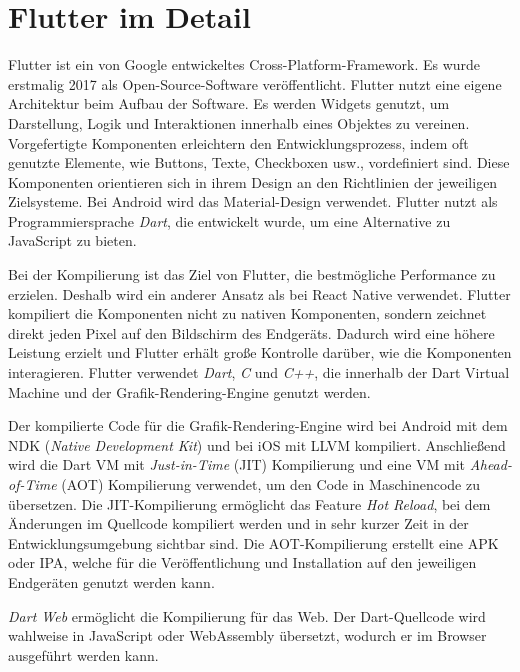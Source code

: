 \section{Flutter im Detail}
Flutter ist ein von Google entwickeltes Cross-Platform-Framework. Es wurde erstmalig 2017 als Open-Source-Software veröffentlicht. Flutter nutzt eine eigene Architektur beim Aufbau der Software. Es werden Widgets genutzt, um Darstellung, Logik und Interaktionen innerhalb eines Objektes zu vereinen. Vorgefertigte Komponenten erleichtern den Entwicklungsprozess, indem oft genutzte Elemente, wie Buttons, Texte, Checkboxen usw., vordefiniert sind. Diese Komponenten orientieren sich in ihrem Design an den Richtlinien der jeweiligen Zielsysteme. Bei Android wird das Material-Design verwendet. Flutter nutzt als Programmiersprache \textit{Dart}, die entwickelt wurde, um eine Alternative zu JavaScript zu bieten.

\vspace{0.5cm}

Bei der Kompilierung ist das Ziel von Flutter, die bestmögliche Performance zu erzielen. Deshalb wird ein anderer Ansatz als bei React Native verwendet. Flutter kompiliert die Komponenten nicht zu nativen Komponenten, sondern zeichnet direkt jeden Pixel auf den Bildschirm des Endgeräts. Dadurch wird eine höhere Leistung erzielt und Flutter erhält große Kontrolle darüber, wie die Komponenten interagieren. Flutter verwendet \textit{Dart}, \textit{C} und \textit{C++}, die innerhalb der Dart Virtual Machine und der Grafik-Rendering-Engine genutzt werden.

\vspace{0.5cm}

Der kompilierte Code für die Grafik-Rendering-Engine wird bei Android mit dem NDK (\textit{Native Development Kit}) und bei iOS mit LLVM kompiliert. Anschließend wird die Dart VM mit \textit{Just-in-Time} (JIT) Kompilierung und eine VM mit \textit{Ahead-of-Time} (AOT) Kompilierung verwendet, um den Code in Maschinencode zu übersetzen. Die JIT-Kompilierung ermöglicht das Feature \textit{Hot Reload}, bei dem Änderungen im Quellcode kompiliert werden und in sehr kurzer Zeit in der Entwicklungsumgebung sichtbar sind. Die AOT-Kompilierung erstellt eine APK oder IPA, welche für die Veröffentlichung und Installation auf den jeweiligen Endgeräten genutzt werden kann.

\vspace{0.5cm}

\textit{Dart Web} ermöglicht die Kompilierung für das Web. Der Dart-Quellcode wird wahlweise in JavaScript oder WebAssembly übersetzt, wodurch er im Browser ausgeführt werden kann.

